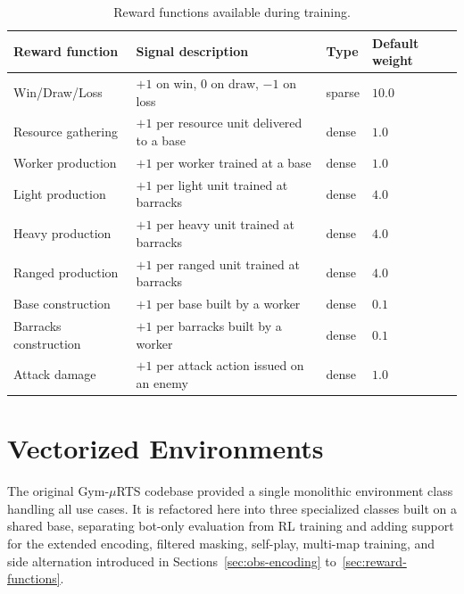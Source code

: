 \begin{table}[!ht]
\centering
\caption[Reward functions available during training]{Reward functions available during training.}
\label{tab:reward-functions}
\small
\begin{tabularx}{\textwidth}{p{3.2cm}Xp{1.5cm}p{2cm}}
\toprule
\textbf{Reward function} & \textbf{Signal description} & \textbf{Type} & \textbf{Default weight} \\
\midrule
Win/Draw/Loss         & $+1$ on win, $0$ on draw, $-1$ on loss                                          & sparse & $10.0$ \\
Resource gathering    & $+1$ per resource unit delivered to a base                                      & dense  & $1.0$ \\
Worker production     & $+1$ per worker trained at a base                                               & dense  & $1.0$  \\
Light production      & $+1$ per light unit trained at barracks                                         & dense  & $4.0$  \\
Heavy production      & $+1$ per heavy unit trained at barracks                                         & dense  & $4.0$  \\
Ranged production     & $+1$ per ranged unit trained at barracks                                        & dense  & $4.0$  \\
Base construction     & $+1$ per base built by a worker                                                 & dense  & $0.1$  \\
Barracks construction & $+1$ per barracks built by a worker                                             & dense  & $0.1$  \\
Attack damage         & $+1$ per attack action issued on an enemy                                       & dense  & $1.0$  \\
\bottomrule
\end{tabularx}
\end{table}

\section{Vectorized Environments}
\label{sec:envs}

The original Gym-$\mu$RTS codebase provided a single monolithic environment class handling all use cases. It is refactored here into three specialized classes built on a shared base, separating bot-only evaluation from RL training and adding support for the extended encoding, filtered masking, self-play, multi-map training, and side alternation introduced in Sections~\ref{sec:obs-encoding} to~\ref{sec:reward-functions}.

